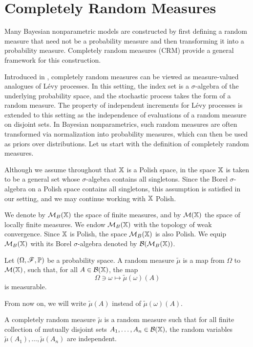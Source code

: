 \section{Completely Random Measures}\label{section:bnp_toolbox_completely_random_measures}

Many Bayesian nonparametric models are constructed by first defining a random measure that need not be a probability measure and then transforming it into a probability measure. Completely random measures (CRM) provide a general framework for this construction.

Introduced in \cite{kingman1967completely}, completely random measures can be viewed as measure-valued analogues of L\'evy processes. In this setting, the index set is a $\sigma$-algebra of the underlying probability space, and the stochastic process takes the form of a random measure. The property of independent increments for L\'evy processes is extended to this setting as the independence of evaluations of a random measure on disjoint sets. In Bayesian nonparametrics, such random measures are often transformed via normalization into probability measures, which can then be used as priors over distributions. Let us start with the definition of completely random measures.

Although we assume throughout that $\mathbb{X}$ is a Polish space, in \cite{kingman1967completely} the space $\mathbb{X}$ is taken to be a general set whose $\sigma$-algebra contains all singletons. Since the Borel $\sigma$-algebra on a Polish space contains all singletons, this assumption is satisfied in our setting, and we may continue working with $\mathbb{X}$ Polish.

We denote by $\mathcal{M}_B(\mathbb{X})$ the space of finite measures, and by $\mathcal{M}(\mathbb{X})$ the space of locally finite measures. We endow $\mathcal{M}_B(\mathbb{X})$ with the topology of weak convergence. Since $\mathbb{X}$ is Polish, the space $\mathcal{M}_B(\mathbb{X})$ is also Polish. We equip $\mathcal{M}_B(\mathbb{X})$ with its Borel $\sigma$-algebra denoted by $\mathcal{B}(\mathcal{M}_B(\mathbb{X}))$.

\begin{definition}
Let $\left( \Omega, \mathscr{F}, \mathbb{P} \right)$ be a probability space. A random measure $\tilde{\mu}$ is a map from $\Omega$ to $\mathcal{M}(\mathbb{X})$, such that, for all $A \in \mathcal{B}(\mathbb{X})$, the map
\[
\Omega \ni \omega \mapsto \tilde{\mu}(\omega)(A)
\]
is measurable.
\end{definition}

From now on, we will write $\tilde{\mu}(A)$ instead of $\tilde{\mu}(\omega)(A)$.

\begin{definition}\label{definition:CRM}
A completely random measure $\tilde{\mu}$ is a random measure such that for all finite collection of mutually disjoint sets $A_1,\dots, A_n \in \mathcal{B}(\mathbb{X}),$ the random variables $\tilde{\mu}(A_1),\dots, \tilde{\mu}(A_n)$ are independent. 
\end{definition}

